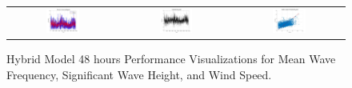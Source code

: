 \begin{figure}[ht!]
\begin{tabular}{ccc}
    \includegraphics[width=0.32\textwidth]{graphs/hybrid/48 hours/wind_speed/actual vs forecast.jpg} &
    \includegraphics[width=0.32\textwidth]{graphs/hybrid/48 hours/wind_speed/residuals.jpg} &
    \includegraphics[width=0.32\textwidth]{graphs/hybrid/48 hours/wind_speed/scatter plot.jpg} \\
  \end{tabular}
  \caption{Hybrid Model 48 hours Performance Visualizations for Mean Wave Frequency, Significant Wave Height, and Wind Speed.}
  \label{fig:hybrid_48_hours}
\end{figure}

